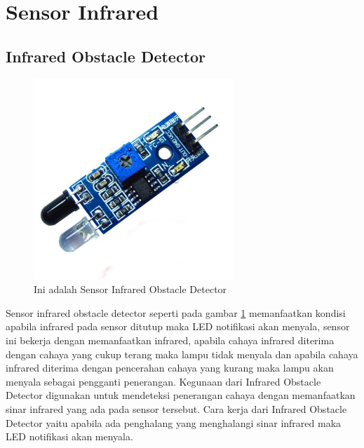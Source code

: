 \section{Sensor Infrared}
\subsection{Infrared Obstacle Detector}
\begin{figure}[!htbp]
  \centering
  \includegraphics[width=.75\textwidth]{figures/Arduino/sensorinfrared.png}
  \caption{Ini adalah Sensor Infrared Obstacle Detector}\label{fig:obstacle}
\end{figure}
Sensor infrared obstacle detector seperti pada gambar \ref{fig:obstacle} memanfaatkan kondisi apabila infrared pada sensor ditutup maka LED notifikasi akan menyala, sensor ini bekerja dengan memanfaatkan infrared, apabila cahaya infrared diterima dengan cahaya yang cukup terang maka lampu tidak menyala dan apabila cahaya infrared diterima dengan pencerahan cahaya yang kurang maka lampu akan menyala sebagai pengganti penerangan. Kegunaan dari Infrared Obstacle Detector digunakan untuk mendeteksi penerangan cahaya dengan memanfaatkan sinar infrared yang ada pada sensor tersebut. Cara kerja dari Infrared Obstacle Detector yaitu apabila ada penghalang yang menghalangi sinar infrared maka LED notifikasi akan menyala.

